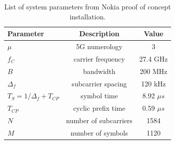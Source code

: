 \begin{table}[t]
	\centering 
	\caption{List of system parameters from Nokia proof of concept installation.}
	\label{table:PoCparams}
	\begin{tabular}{|p{9em} c c |}
		\hline
		\rowcolor{bluepoli!40} %
		\textbf{Parameter} & \textbf{Description} & \textbf{Value}  \T\B \\
		\hline \hline
		$\mu$ & 5G numerology & 3 \T\B \\
		$f_C$ & carrier frequency & 27.4 GHz \T\B \\
		$B$ & bandwidth & 200 MHz \T\B\\
		$\Delta_f$ & subcarrier spacing & 120 kHz  \T\B\\
		$T_S = 1/\Delta_f + T_{CP}$ & symbol time & 8.92 $\mu s$  \T\B\\
		$T_{CP}$ & cyclic prefix time & 0.59 $\mu s$  \T\B\\
		$N$ & number of subcarriers & 1584  \T\B\\
		$M$ & number of symbols & 1120  \B\\
		
		\hline
	\end{tabular}
	\\[10pt]
\end{table}


    
    
    